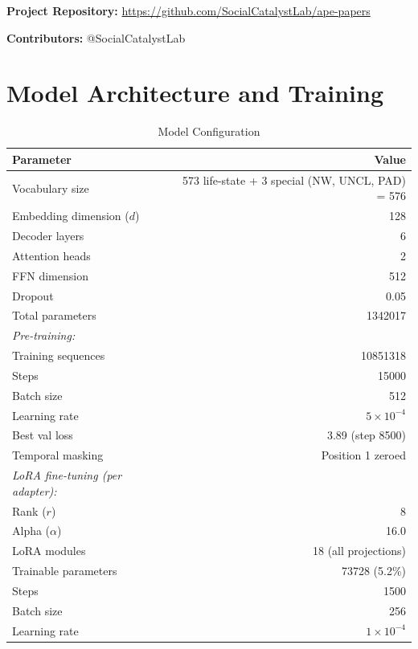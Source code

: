 \documentclass[12pt]{article}
\begin{document}
\newpage

\noindent\textbf{Project Repository:} \url{https://github.com/SocialCatalystLab/ape-papers}

\noindent\textbf{Contributors:} @SocialCatalystLab

\label{apep_main_text_end}



\newpage
\appendix

\section{Model Architecture and Training}
\label{app:model}

\begin{table}[H]
\centering
\caption{Model Configuration}
\label{tab:config}
\begin{tabular}{lr}
\toprule
Parameter & Value \\
\midrule
Vocabulary size & 573 life-state + 3 special (NW, UNCL, PAD) = 576 \\
Embedding dimension ($d$) & 128 \\
Decoder layers & 6 \\
Attention heads & 2 \\
FFN dimension & 512 \\
Dropout & 0.05 \\
Total parameters & \num{1342017} \\
\addlinespace
\textit{Pre-training:} & \\
\quad Training sequences & \num{10851318} \\
\quad Steps & \num{15000} \\
\quad Batch size & 512 \\
\quad Learning rate & $5 \times 10^{-4}$ \\
\quad Best val loss & 3.89 (step \num{8500}) \\
\quad Temporal masking & Position 1 zeroed \\
\addlinespace
\textit{LoRA fine-tuning (per adapter):} & \\
\quad Rank ($r$) & 8 \\
\quad Alpha ($\alpha$) & 16.0 \\
\quad LoRA modules & 18 (all projections) \\
\quad Trainable parameters & \num{73728} (5.2\%) \\
\quad Steps & \num{1500} \\
\quad Batch size & 256 \\
\quad Learning rate & $1 \times 10^{-4}$ \\
\bottomrule
\end{tabular}
\end{table}
\end{document}
